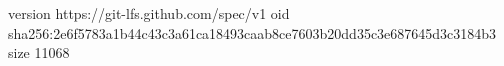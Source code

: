 version https://git-lfs.github.com/spec/v1
oid sha256:2e6f5783a1b44c43c3a61ca18493caab8ce7603b20dd35c3e687645d3c3184b3
size 11068
